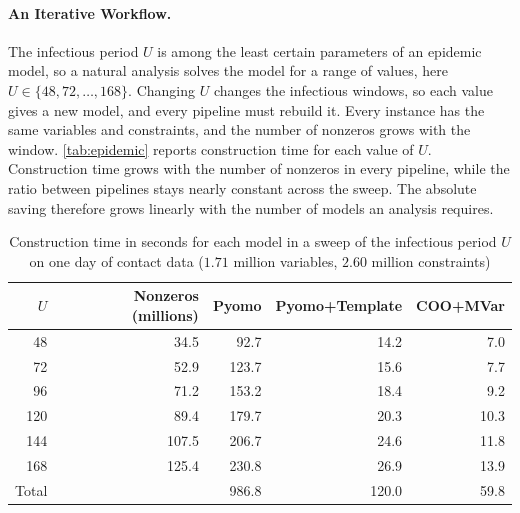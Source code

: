 \paragraph{An Iterative Workflow.} The infectious period $U$ is among the least certain parameters of an epidemic model, so a natural analysis solves the model for a range of values, here $U \in \{48, 72, \dots, 168\}$. Changing $U$ changes the infectious windows, so each value gives a new model, and every pipeline must rebuild it. Every instance has the same variables and constraints, and the number of nonzeros grows with the window. \autoref{tab:epidemic} reports construction time for each value of $U$. Construction time grows with the number of nonzeros in every pipeline, while the ratio between pipelines stays nearly constant across the sweep. The absolute saving therefore grows linearly with the number of models an analysis requires.

\begin{table}[tb]
\centering
\caption{Construction time in seconds for each model in a sweep of the infectious period $U$ on one day of contact data ($1.71$ million variables, $2.60$ million constraints)}
\label{tab:epidemic}
\footnotesize
\begin{tabular}{@{}rrrrr@{}}
\toprule
$U$ & Nonzeros (millions) & Pyomo & Pyomo+Template & COO+MVar \\
\midrule
48  & 34.5  & 92.7  & 14.2 & 7.0 \\
72  & 52.9  & 123.7 & 15.6 & 7.7 \\
96  & 71.2  & 153.2 & 18.4 & 9.2 \\
120 & 89.4  & 179.7 & 20.3 & 10.3 \\
144 & 107.5 & 206.7 & 24.6 & 11.8 \\
168 & 125.4 & 230.8 & 26.9 & 13.9 \\
\midrule
Total & & 986.8 & 120.0 & 59.8 \\
\bottomrule
\end{tabular}
\end{table}
